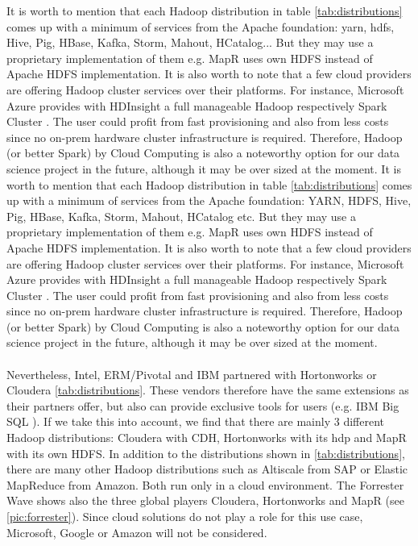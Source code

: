 \documentclass[12pt]{article}
\begin{document}
\noindent It is worth to mention that each Hadoop distribution in table \ref{tab:distributions} comes up with a minimum of services from the Apache foundation: \ac{yarn}, \ac{hdfs}, Hive, Pig, HBase, Kafka, Storm, Mahout, HCatalog... But they may use a proprietary implementation of them e.g. MapR uses own HDFS instead of Apache HDFS implementation. It is also worth to note that a few cloud providers are offering Hadoop cluster services over their platforms. For instance, Microsoft Azure provides with HDInsight a full manageable Hadoop respectively Spark Cluster \citep{Microsoft2018}. The user could profit from fast provisioning and also from less costs since no on-prem hardware cluster infrastructure is required. Therefore, Hadoop (or better Spark) by Cloud Computing is also a noteworthy option for our data science project in the future, although it may be over sized at the moment. It is worth to mention that each Hadoop distribution in table \ref{tab:distributions} comes up with a minimum of services from the Apache foundation: YARN, HDFS, Hive, Pig, HBase, Kafka, Storm, Mahout, HCatalog etc. But they may use
a proprietary implementation of them e.g. MapR uses own HDFS instead of Apache HDFS implementation. 
It is also worth to note that a few cloud providers are offering Hadoop cluster services over their platforms. 
For instance, Microsoft Azure provides with HDInsight a full manageable Hadoop respectively Spark Cluster
\citep{Microsoft2018}. The user could profit from fast provisioning and also from less costs since no on-prem hardware
cluster infrastructure is required. Therefore, Hadoop (or better Spark) by Cloud Computing is also a
noteworthy option for our data science project in the future, although it may be over sized at the moment.\\\\
Nevertheless, Intel, ERM/Pivotal and IBM partnered with Hortonworks or Cloudera \ref{tab:distributions}. These vendors therefore have the same extensions as their partners offer, but also can provide exclusive tools for users (e.g. IBM Big SQL \citep{MervAdrian2017}). If we take this into account, we find that there are mainly 3 different Hadoop distributions: Cloudera with CDH, Hortonworks with its \ac{hdp} and MapR with its own HDFS. In addition to the distributions shown in \ref{tab:distributions}, there are many other Hadoop distributions such as Altiscale from SAP or Elastic MapReduce from Amazon. Both run only in a cloud environment. The Forrester Wave shows also the three global players Cloudera, Hortonworks and MapR (see \ref{pic:forrester}). Since cloud solutions do not play a role for this use case, Microsoft, Google or Amazon will not be considered.
\end{document}
